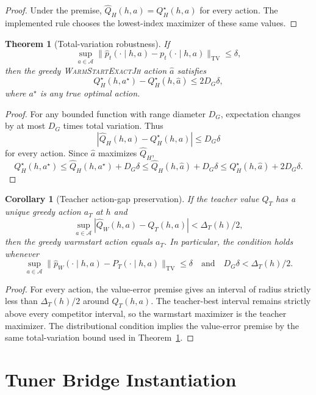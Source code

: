 \documentclass[11pt]{article}
\newtheorem{theorem}{Theorem}
\newtheorem{corollary}{Corollary}
\newcommand{\Warm}{\textnormal{\textsc{WarmStartExactJh}}}
\newcommand{\Act}{\mathcal{A}}
\newcommand{\TV}{\mathrm{TV}}
\newcommand{\PT}{P_T}
\newcommand{\QT}{Q_T}
\begin{document}
\begin{proof}
Under the premise, \(\widehat Q_H(h,a)=Q^\star_H(h,a)\) for every action.
The implemented rule chooses the lowest-index maximizer of these same values.
\end{proof}

\begin{theorem}[Total-variation robustness]
\label{thm:tv-robustness}
If
\[
\sup_{a\in\Act}
\|\widehat p_t(\cdot\mid h,a)-p_t(\cdot\mid h,a)\|_{\TV}
\le \delta,
\]
then the greedy \Warm{} action \(\hat a\) satisfies
\[
Q^\star_H(h,a^\star)-Q^\star_H(h,\hat a)\le 2D_G\delta,
\]
where \(a^\star\) is any true optimal action.
\end{theorem}

\begin{proof}
For any bounded function with range diameter \(D_G\), expectation changes by
at most \(D_G\) times total variation. Thus
\[
|\widehat Q_H(h,a)-Q^\star_H(h,a)|\le D_G\delta
\]
for every action. Since \(\hat a\) maximizes \(\widehat Q_H\),
\[
Q^\star_H(h,a^\star)
\le \widehat Q_H(h,a^\star)+D_G\delta
\le \widehat Q_H(h,\hat a)+D_G\delta
\le Q^\star_H(h,\hat a)+2D_G\delta.
\]
\end{proof}

\begin{corollary}[Teacher action-gap preservation]
If the teacher value \(\QT\) has a unique greedy action \(a_T\) at \(h\) and
\[
\sup_{a\in\Act}|\widehat Q_W(h,a)-\QT(h,a)|<\Delta_T(h)/2,
\]
then the greedy warmstart action equals \(a_T\). In particular, the condition
holds whenever
\[
\sup_{a\in\Act}\|\widehat p_W(\cdot\mid h,a)-\PT(\cdot\mid h,a)\|_{\TV}
\le\delta
\quad\text{and}\quad
D_G\delta<\Delta_T(h)/2.
\]
\end{corollary}

\begin{proof}
For every action, the value-error premise gives an interval of radius
strictly less than \(\Delta_T(h)/2\) around \(\QT(h,a)\). The teacher-best
interval remains strictly above every competitor interval, so the warmstart
maximizer is the teacher maximizer. The distributional condition implies the
value-error premise by the same total-variation bound used in
Theorem~\ref{thm:tv-robustness}.
\end{proof}

\section{Tuner Bridge Instantiation}
\label{sec:tuner-bridge}
\end{document}
